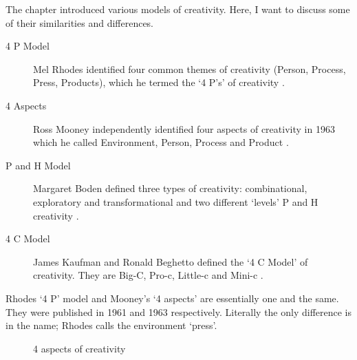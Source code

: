 The  chapter introduced various models of creativity. Here, I want to discuss some of their similarities and differences.

\begin{description}
  \item [4 P Model] Mel Rhodes identified four common themes of creativity (Person, Process, Press, Products), which he termed the `4 P\rq s' of creativity \autocite{Rhodes1961}.
  \item [4 Aspects] Ross Mooney independently identified four aspects of creativity in 1963 which he called Environment, Person, Process and Product \autocite[as cited in][]{Sternberg1999}.
  \item [P and H Model] Margaret Boden defined three types of creativity: combinational, exploratory and transformational and two different `levels' P and H creativity \autocite{Boden2003}.
  \item [4 C Model] James Kaufman and Ronald Beghetto defined the `4 C Model' of creativity. They are Big-C, Pro-c, Little-c and Mini-c \autocite{Kaufman2009}.
\end{description}


Rhodes `4 P' model and Mooney's `4 aspects' are essentially one and the same. They were published in 1961 and 1963 respectively. Literally the only difference is in the name; Rhodes calls the environment `press'.

\begin{figure}[!htbp] %
  \centering
  \tikzset{every fit/.append style=text badly centered}
\caption[4 aspects of creativity]{4 aspects of creativity}
\label{fig:4Crea}
\end{figure}

